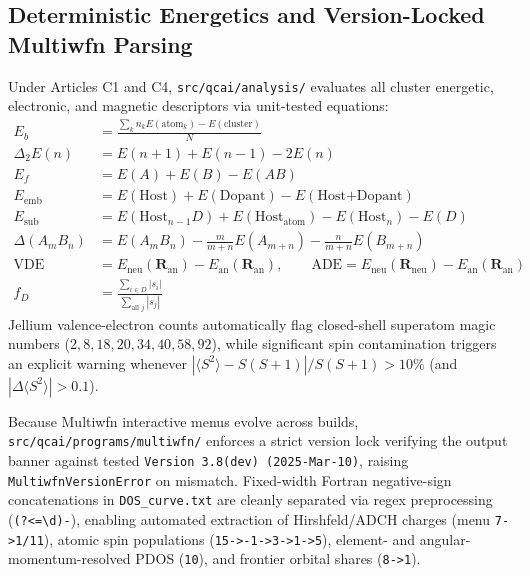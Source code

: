 \documentclass[journal=jcisd8,manuscript=article]{achemso}
\begin{document}
\subsection{Deterministic Energetics and Version-Locked Multiwfn Parsing}

Under Articles C1 and C4, \texttt{src/qcai/analysis/} evaluates all cluster energetic, electronic, and magnetic descriptors via unit-tested equations:
\begin{align}
  E_b &= \frac{\sum_k n_k E(\text{atom}_k) - E(\text{cluster})}{N} \label{eq:eb} \\
  \Delta_2 E(n) &= E(n+1) + E(n-1) - 2E(n) \label{eq:d2e} \\
  E_f &= E(A) + E(B) - E(AB) \label{eq:ef} \\
  E_{\text{emb}} &= E(\text{Host}) + E(\text{Dopant}) - E(\text{Host+Dopant}) \label{eq:eemb} \\
  E_{\text{sub}} &= E(\text{Host}_{n-1}D) + E(\text{Host}_{\text{atom}}) - E(\text{Host}_n) - E(D) \label{eq:esub} \\
  \Delta(A_m B_n) &= E(A_m B_n) - \frac{m}{m+n}E(A_{m+n}) - \frac{n}{m+n}E(B_{m+n}) \label{eq:mix} \\
  \text{VDE} &= E_{\text{neu}}(\mathbf{R}_{\text{an}}) - E_{\text{an}}(\mathbf{R}_{\text{an}}), \qquad
  \text{ADE} = E_{\text{neu}}(\mathbf{R}_{\text{neu}}) - E_{\text{an}}(\mathbf{R}_{\text{an}}) \label{eq:pes} \\
  f_D &= \frac{\sum_{i \in D}|s_i|}{\sum_{\text{all } j}|s_j|} \label{eq:fd}
\end{align}
Jellium valence-electron counts automatically flag closed-shell superatom magic numbers ($2, 8, 18, 20, 34, 40, 58, 92$), while significant spin contamination triggers an explicit warning whenever $|\langle S^2 \rangle - S(S+1)| / S(S+1) > 10\%$ (and $|\Delta \langle S^2 \rangle| > 0.1$).

Because Multiwfn interactive menus evolve across builds, \texttt{src/qcai/programs/multiwfn/} enforces a strict version lock verifying the output banner against tested \texttt{Version 3.8(dev) (2025-Mar-10)}, raising \texttt{MultiwfnVersionError} on mismatch. Fixed-width Fortran negative-sign concatenations in \texttt{DOS\_curve.txt} are cleanly separated via regex preprocessing (\texttt{(?<=\textbackslash d)-}), enabling automated extraction of Hirshfeld/ADCH charges (menu \texttt{7->1/11}), atomic spin populations (\texttt{15->-1->3->1->5}), element- and angular-momentum-resolved PDOS (\texttt{10}), and frontier orbital shares (\texttt{8->1}).
\end{document}

